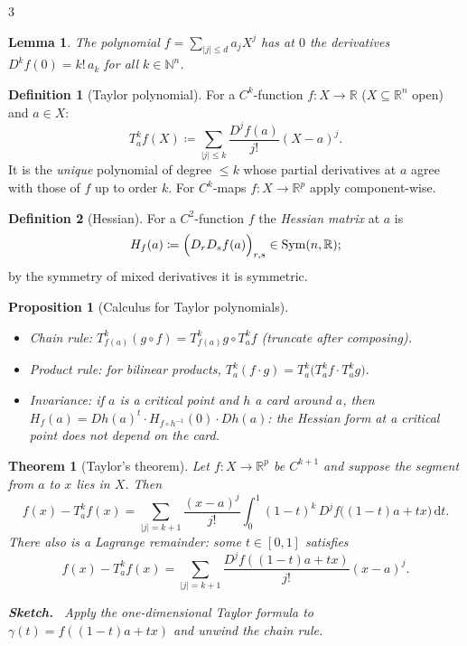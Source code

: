 \documentclass[10pt,a4paper,landscape]{article}
\theoremstyle{definition}
\newtheorem{defn}{Definition}[section]
\theoremstyle{plain}
\newtheorem{thm}{Theorem}[section]
\newtheorem{lem}{Lemma}[section]
\newtheorem{prop}{Proposition}[section]
\theoremstyle{remark}
\newcommand{\R}{\mathbb{R}}
\newcommand{\N}{\mathbb{N}}
\newcommand{\dd}{\,\mathrm{d}}
\newcommand{\abs}[1]{\lvert #1 \rvert}
\newcommand{\deq}{\coloneqq}
\newcommand{\comp}{\circ}
\DeclareMathOperator{\Sym}{Sym}
\newenvironment{proofsketch}{%
  \par\small\color{exgray}\textbf{Sketch.}\ }%
  {\par}
\begin{document}
\begin{multicols*}{3}
\begin{lem}
The polynomial $f = \sum_{\abs{j} \le d} a_j X^j$ has at $0$ the derivatives $D^k f(0) = k!\, a_k$ for all $k \in \N^n$.
\end{lem}

\begin{defn}[Taylor polynomial]
For a $C^k$-function $f: X \to \R$ ($X \subseteq \R^n$ open) and $a \in X$:
\[
T_a^k f(X) \deq \sum_{\abs{j} \le k} \frac{D^j f(a)}{j!} (X - a)^j .
\]
It is the \emph{unique} polynomial of degree $\le k$ whose partial derivatives at $a$ agree with those of $f$ up to order $k$. For $C^k$-maps $f: X \to \R^p$ apply component-wise.
\end{defn}

\begin{defn}[Hessian]
For a $C^2$-function $f$ the \emph{Hessian matrix} at $a$ is
\[
H_f(a) \deq \Bigl( D_r D_s f(a) \Bigr)_{r,s} \in \Sym(n, \R);
\]
by the symmetry of mixed derivatives it is symmetric.
\end{defn}

\begin{prop}[Calculus for Taylor polynomials]
\begin{itemize}
\item Chain rule: $T_{f(a)}^k(g \comp f) = T_{f(a)}^k g \comp T_a^k f$ (truncate after composing).
\item Product rule: for bilinear products, $T_a^k(f \cdot g) = T_a^k\bigl(T_a^k f \cdot T_a^k g\bigr)$.
\item Invariance: if $a$ is a critical point and $h$ a card around $a$, then $H_f(a) = Dh(a)^t \cdot H_{f \comp h^{-1}}(0) \cdot Dh(a)$: the Hessian form at a critical point does not depend on the card.
\end{itemize}
\end{prop}

\begin{thm}[Taylor's theorem]
Let $f: X \to \R^p$ be $C^{k+1}$ and suppose the segment from $a$ to $x$ lies in $X$. Then
{\footnotesize\[
f(x) - T_a^k f(x) = \sum_{\abs{j} = k+1} \frac{(x-a)^j}{j!} \int_0^1 (1-t)^{k}\, D^j f\bigl((1-t)a + tx\bigr) \dd t .
\]}
There also is a \emph{Lagrange remainder}: some $t \in [0,1]$ satisfies
\[
f(x) - T_a^k f(x) = \sum_{\abs{j} = k+1} \frac{D^j f((1-t)a + tx)}{j!} (x-a)^j .
\]
\begin{proofsketch}
Apply the one-dimensional Taylor formula to $\gamma(t) = f((1-t)a + tx)$ and unwind the chain rule.
\end{proofsketch}
\end{thm}


\end{multicols*}
\end{document}
